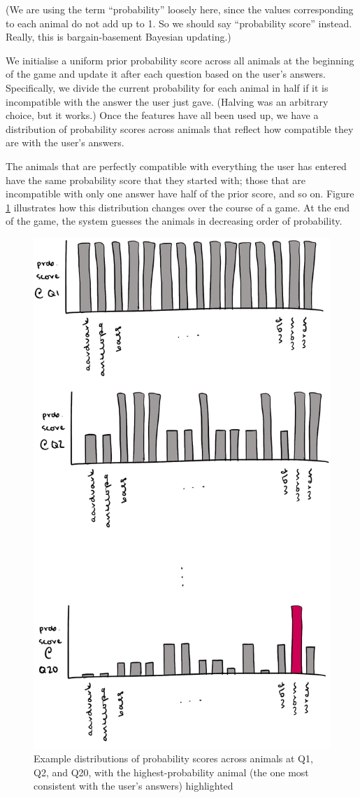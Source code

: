 \documentclass[11pt,a4paper]{article}
\begin{document}
(We are using the term ``probability'' loosely here, since the values corresponding to each animal do not add up to 1.
So we should say ``probability score'' instead.
Really, this is bargain-basement Bayesian updating.)

We initialise a uniform prior probability score across all animals at the beginning of the game and update it after each question based on the user's answers.
Specifically, we divide the current probability for each animal in half if it is incompatible with the answer the user just gave.
(Halving was an arbitrary choice, but it works.)
Once the features have all been used up, we have a distribution of probability scores across animals that reflect how compatible they are with the user's answers.

The animals that are perfectly compatible with everything the user has entered have the same probability score that they started with; those that are incompatible with only one answer have half of the prior score, and so on.
Figure \ref{fig:bayesian-update} illustrates how this distribution changes over the course of a game.
At the end of the game, the system guesses the animals in decreasing order of probability.

\begin{figure}
	\includegraphics[width=.8\linewidth]{Bayesian-updating.png}
	\caption{Example distributions of probability scores across animals at Q1, Q2, and Q20, with the highest-probability animal (the one most consistent with the user's answers) highlighted}
	\label{fig:bayesian-update}
\end{figure}
\end{document}
